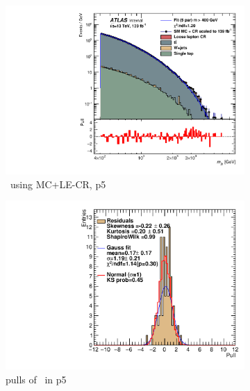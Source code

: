 \begin{figure}[H]
\begin{subfigure}[h]{0.38\linewidth}
    \includegraphics[scale=0.3]{figs/ch6/fit/variable_nosmooth/p5/10PB/output_SMMCplusCR_Mjb_p5.pdf}%
     \caption{\mjb \ using MC+LE-CR, p5}
     \end{subfigure}
     \hfill
    \begin{subfigure}[h]{0.4\linewidth}
    \includegraphics[scale=0.32]{figs/ch6/fit/variable_nosmooth/p5/10PB/pull_SMMCplusCR_Mjb_p5.pdf}%
    \caption{pulls of \mjb \ in p5}
    \end{subfigure}
    \hfill
    \begin{subfigure}[h]{0.38\linewidth}

\end{subfigure}
\end{figure}
